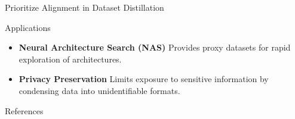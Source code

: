 \documentclass[final]{beamer}
\newlength{\colwidth}
\begin{document}
\begin{columns}
\begin{column}{\colwidth}
\begin{block}{Prioritize Alignment in Dataset Distillation}
\begin{figure}[ht]
			\end{figure}
			
		\begin{block}{Applications}
			\begin{itemize}
				\item \textbf{Neural Architecture Search (NAS)} Provides proxy datasets for rapid exploration of architectures.
				\item \textbf{Privacy Preservation} Limits exposure to sensitive information by condensing data into unidentifiable formats.
			\end{itemize}
		\end{block}
			
		\end{block}
		\begin{block}{References}
			
			\nocite{*}
			\footnotesize{}
			
		\end{block}
	\end{column}
\end{columns}
\end{document}
